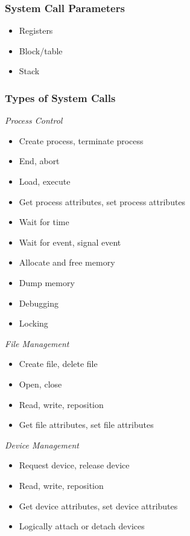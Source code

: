 \documentclass[]{article}
\begin{document}
\subsubsection*{System Call Parameters}

\begin{itemize}
    \item Registers
    \item Block/table
    \item Stack
\end{itemize}

\subsubsection*{Types of System Calls}

\emph{Process Control}
\begin{itemize}
    \item Create process, terminate process
    \item End, abort
    \item Load, execute
    \item Get process attributes, set process attributes
    \item Wait for time
    \item Wait for event, signal event
    \item Allocate and free memory
    \item Dump memory
    \item Debugging
    \item Locking
\end{itemize}

\emph{File Management}
\begin{itemize}
    \item Create file, delete file
    \item Open, close
    \item Read, write, reposition
    \item Get file attributes, set file attributes
\end{itemize}

\emph{Device Management}
\begin{itemize}
    \item Request device, release device
    \item Read, write, reposition
    \item Get device attributes, set device attributes
    \item Logically attach or detach devices
\end{itemize}
\end{document}
